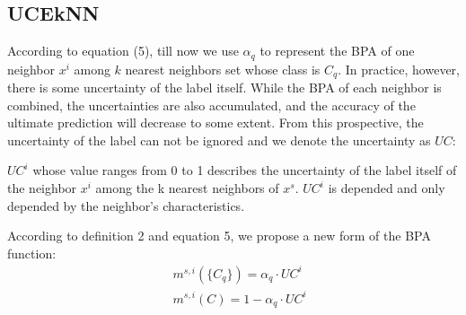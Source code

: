\documentclass[runningheads]{llncs}
\begin{document}
\subsection{UCEkNN}
According to equation (5), till now we use $\alpha _q$ to represent the BPA of one neighbor $x^i$ among $k$ nearest neighbors set whose class is $C_q$. In practice, however, there is some uncertainty of the label itself. While the BPA of each neighbor is combined, the uncertainties are also accumulated, and the accuracy of the ultimate prediction will decrease to some extent. From this prospective, the uncertainty of the label can not be ignored and we denote the uncertainty as $UC$:
\begin{definition}
 $UC^i$ whose value ranges from 0 to 1 describes the uncertainty of the label itself of the neighbor $x^i$ among the k nearest neighbors of $x^s$. $UC^i$ is depended and only depended by the neighbor's characteristics.
\end{definition}
According to definition 2 and equation 5, we propose a new form of the BPA function:
\begin{equation}
\begin{split}
&\ m^{s,i}( \{C_q\}) = \alpha_q \cdot {UC}^i
\\
&\ m^{s,i}(C) = 1-\alpha_q \cdot {UC}^i
\end{split}
\end{equation}
\end{document}
